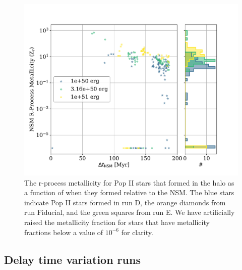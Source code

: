\documentclass[fleqn,usenatbib]{mnras}
\begin{document}
\begin{figure} 
	\includegraphics[width=\columnwidth]{plots/eng_NSM_deltat.pdf}
	\caption[R-process metallicity as a function of $\Delta t_{\mathrm{NSM}}$ for the energy variation runs.]{The r-process metallicity for Pop II stars that formed in the halo as a function of when they formed relative to the NSM. The blue stars indicate Pop II stars formed in run D, the orange diamonds from run Fiducial, and the green squares from run E. We have artificially raised the metallicity fraction for stars that have metallicity fractions below a value of $10^{-6}$ for clarity.}
	\label{fig:eng_NSM_deltat}
\end{figure}

\subsection{Delay time variation runs} \label{sec:time_vary}
\end{document}

